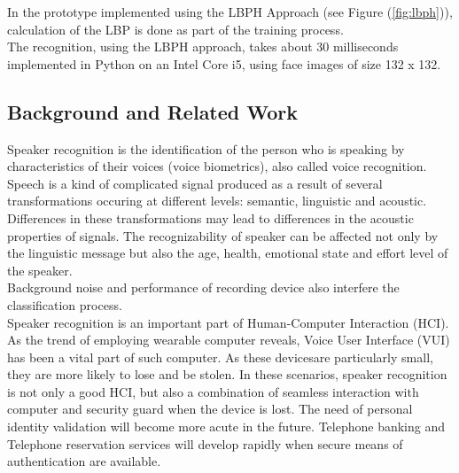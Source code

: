 In the prototype implemented using the LBPH Approach (see Figure (\ref{fig:lbph})), calculation of the
LBP is done as part of the training process. \\
The recognition, using the LBPH approach, takes about 30 milliseconds
implemented in Python on an Intel Core i5, using face images of size 132 x 132. \\

\subsection{Background and Related Work}
Speaker recognition is the identification of the person who is speaking by
characteristics of their voices (voice biometrics), also called voice recognition. \\
Speech is a kind of complicated signal produced as a result of several transformations
occuring at different levels: semantic, linguistic and acoustic. Differences in these transformations may lead to differences in the acoustic properties of signals. The recognizability of speaker can be affected not only by the linguistic message but also the age, health, emotional state and effort level of the speaker. \\
Background noise and performance of recording device also interfere the classification process. \\
Speaker recognition is an important part of Human-Computer Interaction (HCI). As the trend of employing wearable computer reveals, Voice User Interface (VUI) has been a vital part of such computer. As these devicesare particularly small, they are more likely to lose and be stolen. In these scenarios, speaker recognition is not only a good HCI, but also a combination of seamless interaction with computer and security guard when the device is lost. The need of personal identity validation will become more acute in the future. Telephone banking and Telephone reservation services will develop rapidly when secure means of authentication are available. \\

